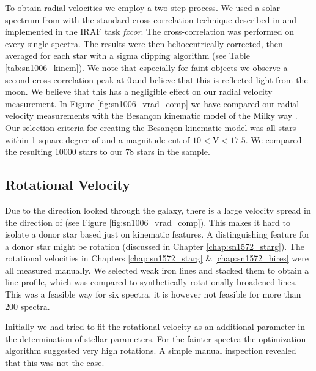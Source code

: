 To obtain radial velocities we employ a two step process. We used a solar spectrum from \citet{1984sfat.book.....K} with the standard cross-correlation technique described in \citet{1979AJ.....84.1511T} and implemented in the IRAF task \textit{fxcor}. The cross-correlation was performed on every single spectra. The results were then heliocentrically corrected, then averaged for each star with a sigma clipping algorithm (see Table \ref{tab:sn1006_kinem}). We note that especially for faint objects we observe a second cross-correlation peak at 0\,\kms and believe that this is reflected light from the moon. We believe that this has a negligible effect on our radial velocity measurement.
In Figure \ref{fig:sn1006_vrad_comp} we have compared our radial velocity measurements with the Besan\c{c}on kinematic model of the Milky way \citep{2003A&A...409..523R}. Our selection criteria for creating the  Besan\c{c}on kinematic model was all stars within 1 square degree of  and a magnitude cut of $10<\textrm{V}<17.5$. We compared the resulting 10000 stars to our 78 stars in the sample. 




\subsection{Rotational Velocity}
\label{sec:sn1006_rotvel}
Due to the direction looked through the galaxy, there is a large velocity spread in the direction of  (see Figure \ref{fig:sn1006_vrad_comp}). This makes it hard to isolate a donor star based just on kinematic features. A distinguishing feature for a donor star might be rotation (discussed in Chapter \ref{chap:sn1572_starg}). The rotational velocities in Chapters \ref{chap:sn1572_starg} \& \ref{chap:sn1572_hires} were all measured manually. We selected weak iron lines and stacked them to obtain a line profile, which was compared to synthetically rotationally broadened lines. This was a feasible way for six spectra, it is however not feasible for more than 200 spectra. 

Initially we had tried to fit the rotational velocity as an additional parameter in the determination of stellar parameters. For the fainter spectra the optimization algorithm suggested very high rotations. A simple manual inspection revealed that this was not the case.  

